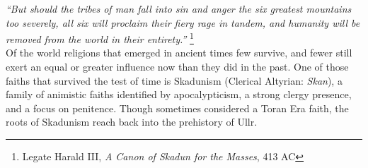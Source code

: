 \textit{``But should the tribes of man fall into sin and anger the six greatest mountains too severely, all six will proclaim their fiery rage in tandem, and humanity will be removed from the world in their entirety.''} \footnote{Legate Harald III, \textit{A Canon of Skadun for the Masses}, 413 AC}\\



Of the world religions that emerged in ancient times few survive, and fewer still exert an equal or greater influence now than they did in the past. One of those faiths that survived the test of time is Skadunism (Clerical Altyrian: \textit{Skan}), a family of animistic faiths identified by apocalypticism, a strong clergy presence, and a focus on penitence. Though sometimes considered a Toran Era faith, the roots of Skadunism reach back into the prehistory of Ullr.

